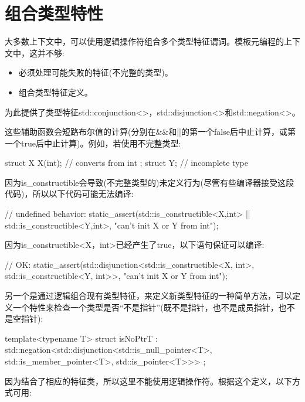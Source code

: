 \section{组合类型特性}

大多数上下文中，可以使用逻辑操作符组合多个类型特征谓词。模板元编程的上下文中，这并不够:

\begin{itemize}
\item 
必须处理可能失败的特征(不完整的类型)。

\item 
组合类型特征定义。
\end{itemize}

为此提供了类型特征std::conjunction<>，std::disjunction<>和std::negation<>。

这些辅助函数会短路布尔值的计算(分别在\&\&和||的第一个false后中止计算，或第一个true后中止计算)。例如，若使用不完整类型:

\begin{cpp}
struct X {
	X(int); // converts from int
};
struct Y; // incomplete type
\end{cpp}

因为is\_constructible会导致(不完整类型的)未定义行为(尽管有些编译器接受这段代码)，所以以下代码可能无法编译:

\begin{cpp}
// undefined behavior:
static_assert(std::is_constructible<X,int>{}
				|| std::is_constructible<Y,int>{},
			"can't init X or Y from int");
\end{cpp}

因为is\_constructible<X，int>已经产生了true，以下语句保证可以编译:

\begin{cpp}
// OK:
static_assert(std::disjunction<std::is_constructible<X, int>,
								std::is_constructible<Y, int>>{},
			"can't init X or Y from int");
\end{cpp}

另一个是通过逻辑组合现有类型特征，来定义新类型特征的一种简单方法，可以定义一个特性来检查一个类型是否“不是指针”(既不是指针，也不是成员指针，也不是空指针):

\begin{cpp}
template<typename T>
struct isNoPtrT : std::negation<std::disjunction<std::is_null_pointer<T>,
												std::is_member_pointer<T>,
												std::is_pointer<T>>>
{
};
\end{cpp}

因为结合了相应的特征类，所以这里不能使用逻辑操作符。根据这个定义，以下方式可用:


